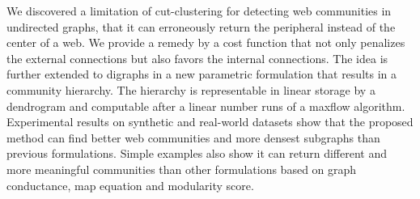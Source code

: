 We discovered a limitation of cut-clustering for detecting web communities in undirected graphs, that it can erroneously return the peripheral instead of the center of a web. We provide a remedy by a cost function that not only penalizes the external connections but also favors the internal connections. The idea is further extended to digraphs in a new parametric formulation that results in a community hierarchy. The hierarchy is representable in linear storage by a dendrogram and computable after a linear number runs of a maxflow algorithm. Experimental results on synthetic and real-world datasets show that the proposed method can find better web communities and more densest subgraphs than previous formulations. Simple examples also show it can return different and more meaningful communities than other formulations based on graph conductance, map equation and modularity score.